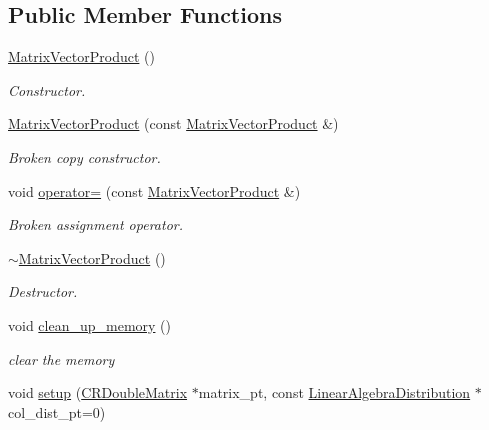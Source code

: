 \subsection*{Public Member Functions}
\begin{DoxyCompactItemize}
\item 
\hyperlink{classoomph_1_1MatrixVectorProduct_af0c48ee8ae2ae94b5f3f38a8071c22f9}{Matrix\+Vector\+Product} ()
\begin{DoxyCompactList}\small\item\em Constructor. \end{DoxyCompactList}\item 
\hyperlink{classoomph_1_1MatrixVectorProduct_a011af8826e958fb575f36360e6267ace}{Matrix\+Vector\+Product} (const \hyperlink{classoomph_1_1MatrixVectorProduct}{Matrix\+Vector\+Product} \&)
\begin{DoxyCompactList}\small\item\em Broken copy constructor. \end{DoxyCompactList}\item 
void \hyperlink{classoomph_1_1MatrixVectorProduct_a9abd4e1d4b91726a7f65a71dd74fefa8}{operator=} (const \hyperlink{classoomph_1_1MatrixVectorProduct}{Matrix\+Vector\+Product} \&)
\begin{DoxyCompactList}\small\item\em Broken assignment operator. \end{DoxyCompactList}\item 
\hyperlink{classoomph_1_1MatrixVectorProduct_add19a8ea5d1901423e334587446f55db}{$\sim$\+Matrix\+Vector\+Product} ()
\begin{DoxyCompactList}\small\item\em Destructor. \end{DoxyCompactList}\item 
void \hyperlink{classoomph_1_1MatrixVectorProduct_a2f61122d228e81ccff144b1298ccbd36}{clean\+\_\+up\+\_\+memory} ()
\begin{DoxyCompactList}\small\item\em clear the memory \end{DoxyCompactList}\item 
void \hyperlink{classoomph_1_1MatrixVectorProduct_aec74f9bdb65ee7ce86590e26a705f3e9}{setup} (\hyperlink{classoomph_1_1CRDoubleMatrix}{C\+R\+Double\+Matrix} $\ast$matrix\+\_\+pt, const \hyperlink{classoomph_1_1LinearAlgebraDistribution}{Linear\+Algebra\+Distribution} $\ast$col\+\_\+dist\+\_\+pt=0)

\end{DoxyCompactItemize}
